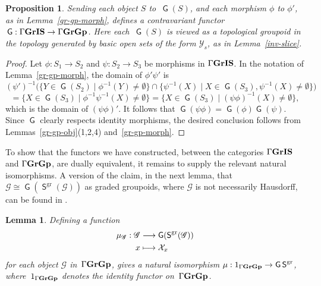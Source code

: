 \documentclass[a4paper,reqno,12pt]{amsart}
\numberwithin{equation}{section}
\theoremstyle{plain}
\newtheorem{prop}[thm]{Proposition}
\newtheorem{lemma}[thm]{Lemma}
\theoremstyle{definition}
\newcommand{\gr}{\operatorname{gr}}
\newcommand{\GIS}{\operatorname{\Gamma\bf{GrIS}}}
\newcommand{\GG}{\operatorname{\Gamma\bf{GrGp}}}
\newcommand{\SG}{\operatorname{\mathsf{S}}}
\newcommand{\GP}{\operatorname{\mathsf{G}}}
\begin{document}
\begin{prop} \label{smgp-to-gp-top}
Sending each object $S$ to $\, \GP(S)$, and each morphism $\phi$ to $\phi'$, as in Lemma~\ref{gr-gp-morph}, defines a contravariant functor $\, \GP : \GIS \to \GG$. Here each $\, \GP(S)$ is viewed as a topological groupoid in the topology generated by basic open sets of the form $\mathcal{Y}_s$, as in Lemma~\ref{inv-slice}.
\end{prop}

\begin{proof}
Let $\phi : S_1 \to S_2$ and $\psi : S_2 \to S_3$ be morphisms in $\GIS$. In the notation of Lemma~\ref{gr-gp-morph}, the domain of $\phi' \psi'$ is
\[(\psi')^{-1}\big(\big\{Y \in \GP(S_2) \mid \phi^{-1}(Y) \neq \emptyset\big\} \cap \big\{\psi^{-1}(X) \mid X \in \GP(S_3), \psi^{-1}(X) \neq \emptyset\big\}\big)\] 
\[= \big\{X \in \GP(S_3) \mid \phi^{-1} \psi^{-1}(X) \neq \emptyset\big\} = \big\{X \in \GP(S_3) \mid (\psi \phi)^{-1}(X) \neq \emptyset\big\},\]
which is the domain of $(\psi \phi)'$. It follows that $\GP(\psi \phi) = \GP(\phi) \GP(\psi)$. Since $\GP$ clearly respects identity morphisms, the desired conclusion follows from Lemmas~\ref{gr-gp-obj}(1,2,4) and~\ref{gr-gp-morph}.
\end{proof}

To show that the functors we have constructed, between the categories $\GIS$ and $\GG$, are dually equivalent, it remains to supply the relevant natural isomorphisms. A version of the claim, in the next lemma, that $\mathscr{G} \cong  \GP(\SG^{\gr}(\mathscr{G}))$ as graded groupoids, where $\mathscr{G}$ is not necessarily Hausdorff, can be found in \cite[Theorem 3.3]{steinberg}.

\begin{lemma} \label{gp-nat-iso}
Defining a function   
\begin{align}
\mu_{\mathscr{G}} : \mathscr{G} & \longrightarrow \GP(\SG^{\gr}(\mathscr{G})) \notag \\
x &\longmapsto \mathcal{X}_x  \notag
\end{align}
for each object $\mathscr{G}$ in $\, \GG$, gives a natural isomorphism $\mu :1_{\GG} \rightarrow \GP\SG^{\gr}$, where $\, 1_{\GG}$ denotes the identity functor on $\, \GG$.
\end{lemma}
\end{document}
